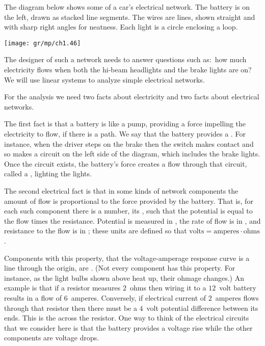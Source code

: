 The diagram below shows some of a car's electrical network.
The battery is on the left, drawn as stacked line segments. 
The wires are lines, shown straight and with sharp right angles
for neatness.
Each light is a circle enclosing a loop.
\begin{center}
  \texttt{[image: gr/mp/ch1.46]}
\end{center}
The designer of such a network needs to answer questions such as:~how 
much electricity flows 
when both the hi-beam headlights and the brake lights are on?
We will use linear systems to analyze simple 
electrical networks. 

For the analysis we need two facts about electricity 
and two facts about electrical networks.

The first fact is that a battery is like a pump,  
providing a force impelling the electricity to flow, if there is a path.  
We say that the battery provides a 
.
For instance, when the driver steps on the brake then the switch makes contact
and so makes a circuit on the left side of the
diagram, which includes the brake lights. 
Once the circuit exists, the battery's force creates a
flow through that circuit, called a , lighting the lights.

The second electrical fact is that in some 
kinds of network components
the amount of flow is proportional to the force provided by the battery.
That is, for each such component there is a number,  
its ,
such that the potential is equal to the flow times the resistance.
Potential is measured in ,
the rate of flow is in ,
and resistance to the flow is in ;
these units are defined so that
$\mbox{volts}=\mbox{amperes}\cdot\mbox{ohms}$.

Components with this property,
that the voltage-amperage response curve is a line through the origin,
are .
(Not every component has this property.
For instance, as the light bulbs shown above 
heat up, their ohmage changes.)
An example is that if a resistor measures $2$~ohms 
then wiring it to a $12$~volt battery 
results in a flow of $6$~amperes.
Conversely, if electrical current of
$2$~amperes flows through that resistor then there must be 
a $4$~volt potential difference between its ends. 
This is the  across the 
resistor.
One way to think of the electrical circuits that we consider here
is that the battery provides a voltage rise while the other components 
are voltage drops.

